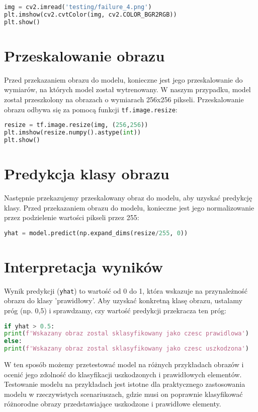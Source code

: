 \begin{lstlisting}[language=Python]
img = cv2.imread('testing/failure_4.png')
plt.imshow(cv2.cvtColor(img, cv2.COLOR_BGR2RGB))
plt.show()
\end{lstlisting}

\section{Przeskalowanie obrazu}
Przed przekazaniem obrazu do modelu, konieczne jest jego przeskalowanie do wymiarów, na których model został wytrenowany. W naszym przypadku, model został przeszkolony na obrazach o wymiarach 256x256 pikseli. Przeskalowanie obrazu odbywa się za pomocą funkcji \texttt{tf.image.resize}:

\begin{lstlisting}[language=Python]
resize = tf.image.resize(img, (256,256))
plt.imshow(resize.numpy().astype(int))
plt.show()
\end{lstlisting}

\section{Predykcja klasy obrazu}
Następnie przekazujemy przeskalowany obraz do modelu, aby uzyskać predykcję klasy. Przed przekazaniem obrazu do modelu, konieczne jest jego normalizowanie przez podzielenie wartości pikseli przez 255:

\begin{lstlisting}[language=Python]
yhat = model.predict(np.expand_dims(resize/255, 0))
\end{lstlisting}

\section{Interpretacja wyników}
Wynik predykcji (\texttt{yhat}) to wartość od 0 do 1, która wskazuje na przynależność obrazu do klasy 'prawidłowy'. Aby uzyskać konkretną klasę obrazu, ustalamy próg (np. 0,5) i sprawdzamy, czy wartość predykcji przekracza ten próg:

\begin{lstlisting}[language=Python]
if yhat > 0.5:
print(f'Wskazany obraz zostal sklasyfikowany jako czesc prawidlowa')
else:
print(f'Wskazany obraz zostal sklasyfikowany jako czesc uszkodzona')
\end{lstlisting}

W ten sposób możemy przetestować model na różnych przykładach obrazów i ocenić jego zdolność do klasyfikacji uszkodzonych i prawidłowych elementów. Testowanie modelu na przykładach jest istotne dla praktycznego zastosowania modelu w rzeczywistych scenariuszach, gdzie musi on poprawnie klasyfikować różnorodne obrazy przedstawiające uszkodzone i prawidłowe elementy.

